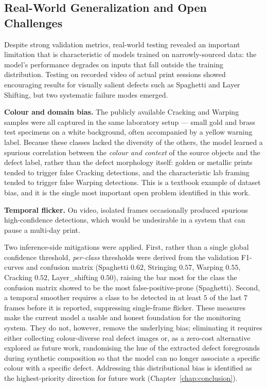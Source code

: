 \documentclass[english, Lau, oneside]{sapthesis}
\begin{document}
\subsection{Real-World Generalization and Open Challenges}

Despite strong validation metrics, real-world testing revealed an important limitation that is characteristic of models trained on narrowly-sourced data: the model's performance degrades on inputs that fall outside the training distribution. Testing on recorded video of actual print sessions showed encouraging results for visually salient defects such as Spaghetti and Layer Shifting, but two systematic failure modes emerged.

\textbf{Colour and domain bias.} The publicly available Cracking and Warping samples were all captured in the same laboratory setup --- small gold and brass test specimens on a white background, often accompanied by a yellow warning label. Because these classes lacked the diversity of the others, the model learned a spurious correlation between the \textit{colour and context} of the source objects and the defect label, rather than the defect morphology itself: golden or metallic prints tended to trigger false Cracking detections, and the characteristic lab framing tended to trigger false Warping detections. This is a textbook example of dataset bias, and it is the single most important open problem identified in this work.

\textbf{Temporal flicker.} On video, isolated frames occasionally produced spurious high-confidence detections, which would be undesirable in a system that can pause a multi-day print.

Two inference-side mitigations were applied. First, rather than a single global confidence threshold, \textit{per-class} thresholds were derived from the validation F1-curves and confusion matrix (Spaghetti $0.62$, Stringing $0.57$, Warping $0.55$, Cracking $0.52$, Layer\_shifting $0.50$), raising the bar most for the class the confusion matrix showed to be the most false-positive-prone (Spaghetti). Second, a temporal smoother requires a class to be detected in at least $5$ of the last $7$ frames before it is reported, suppressing single-frame flicker. These measures make the current model a usable and honest foundation for the monitoring system. They do not, however, remove the underlying bias; eliminating it requires either collecting colour-diverse real defect images or, as a zero-cost alternative explored as future work, randomising the hue of the extracted defect foregrounds during synthetic composition so that the model can no longer associate a specific colour with a specific defect. Addressing this distributional bias is identified as the highest-priority direction for future work (Chapter~\ref{chap:conclusion}).
\end{document}
